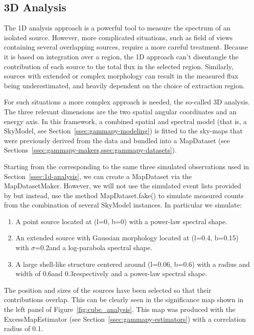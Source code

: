 \subsection{3D Analysis}
\label{ssec:3d-analysis}
The 1D analysis approach is a powerful tool to measure the spectrum of an isolated source. However, more complicated situations, such as field of views containing several overlapping sources, require a more careful treatment. Because it is based on integration over a region, the 1D approach can't disentangle the contribution of each source to the total flux in the selected region. Similarly, sources with extended or complex morphology can result in the measured flux being underestimated, and heavily dependent on the choice of extraction region.

For such situations a more complex approach is needed, the so-called 3D analysis. The three relevant dimensions are the two spatial angular coordinates and an energy axis. In this framework, a combined spatial and spectral model (that is, a SkyModel, see Section~\ref{ssec:gammapy-modeling}) is fitted to the sky-maps that were previously derived from the data and bundled into a MapDataset (see Sections~\ref{ssec:gammapy-makers,ssec:gammapy-datasets}).

Starting from the \irfs corresponding to the same three simulated \cta observations used in Section~\ref{ssec:1d-analysis}, we can create a MapDataset via the MapDatasetMaker. However, we will not use the simulated event lists provided by \cta but instead, use the method MapDataset.fake() to simulate measured counts from the combination of several SkyModel instances. In particular we simulate:
\begin{enumerate}
	\item A point source located at (l=0\textdegree, b=0\textdegree) with a power-law spectral shape.
	\item An extended source with Gaussian morphology located at (l=0.4\textdegree, b=0.15\textdegree) with $\sigma$=0.2\textdegree and a log-parabola spectral shape.
	\item A large shell-like structure centered around (l=0.06\textdegree, b=0.6\textdegree) with a radius and width of 0.6\textdegree and 0.3\textdegree respectively and a power-law spectral shape.
\end{enumerate}
The position and sizes of the sources have been selected so that their contributions overlap. This can be clearly seen in the significance map shown in the left panel of Figure~\ref{fig:cube_analysis}. This map was produced with the ExcessMapEstimator (see Section~\ref{ssec:gammapy-estimators}) with a correlation radius of 0.1\textdegree.

